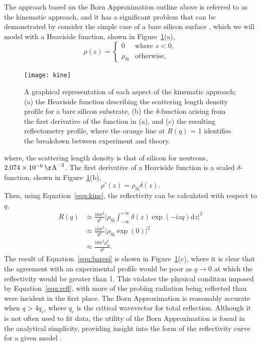 \documentclass[
 reprint,
 superscriptaddress,
 amsmath,amssymb,
 aps,
]{revtex4-1}
\newcommand{\angstrom}{\rm{\AA}}
\begin{document}
The approach based on the Born Approximation outline above is referred to as the kinematic approach, and it has a significant problem that can be demonstrated by consider the simple case of a bare silicon surface \cite{sivia_elementary_2011}, which we will model with a Heaviside function, shown in Figure~\ref{fig:kine}(a), 
%
\begin{equation}
    \rho(z) =
    \begin{cases}
        0 & \text{where } z < 0,\\
        \rho_{\text{Si}} & \text{otherwise},
    \end{cases}
\end{equation}
%
%
\begin{figure}[t]
    \texttt{[image: kine]}
    \caption{A graphical representation of each aspect of the kinematic approach; (a) the Heaviside function describing the scattering length density profile for a bare silicon substrate, (b) the $\delta$-function arising from the first derivative of the function in (a), and (c) the resulting reflectometry profile, where the orange line at $R(q)$ = 1 identifies the breakdown between experiment and theory.}
    \label{fig:kine}
\end{figure}
%
where, the scattering length density is that of silicon for neutrons, $\SI{2.074e-6}{\angstrom^{-2}}$. 
The first derivative of a Heaviside function is a scaled $\delta$-function, shown in Figure~\ref{fig:kine}(b), 
%
\begin{equation}
    \rho'(z) = \rho_{\text{Si}}\delta(z).
\end{equation}
%
Then, using Equation~\ref{equ:kine}, the reflectivity can be calculated with respect to $q$, 
%
\begin{equation}
    \begin{aligned}
    R(q) & \approx \frac{16\pi^2}{q^4} \bigg| \rho_{\text{Si}}\int^{+\infty}_{-\infty}{\delta(z)\exp{(-\mathrm{i} zq) \text{d}z}} \bigg|^2 \\
     & \approx \frac{16\pi^2}{q^4} \bigg| \rho_{\text{Si}} \exp{(0)} \bigg| ^2 \\
     & \approx \frac{16\pi^2\rho_{\text{Si}}^2}{q^4}.
    \end{aligned}
    \label{equ:baresi}
\end{equation}
%
The result of Equation~\ref{equ:baresi} is shown in Figure~\ref{fig:kine}(c), where it is clear that the agreement with an experimental profile would be poor as $q \to 0$ \cite{majkrzak_exact_1998} at which the reflectivity would be greater than \num{1}. 
This violates the physical condition imposed by Equation~\ref{equ:refl}, with more of the probing radiation being reflected than were incident in the first place. 
The Born Approximation is reasonably accurate when $q > 4q_c$, where $q_c$ is the critical wavevector for total reflection. 
Although it is not often used to fit data, the utility of the Born Approximation is found in the analytical simplicity, providing insight into the form of the reflectivity curve for a given model \cite{pershan_liquid_2012}.
\end{document}
